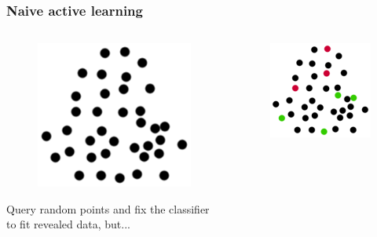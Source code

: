\documentclass{beamer}
\begin{document}
  \begin{frame}
    \frametitle{Naive active learning}
    \begin{columns}
      \begin{column}{5cm}
        \begin{figure}
          \includegraphics[scale=.25]{graphics/presentation/clusters2} 
        \end{figure}
        Query random points and fix the classifier to fit revealed data, but...\\
      \end{column}
      \begin{column}{5cm}
        \begin{figure}
          \includegraphics[scale=.5]{graphics/presentation/al1} 
        \end{figure}
      \end{column}
    \end{columns}
  \end{frame}
\end{document}
